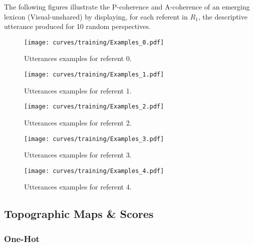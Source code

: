 The following figures illustrate the P-coherence and A-coherence of an emerging lexicon (Visual-unshared) by displaying, for each referent in $R_1$, the descriptive utterance produced for 10 random perspectives.

\begin{figure}[h!]
\centering
    \texttt{[image: curves/training/Examples\_0.pdf]}
\caption{Utterances examples for referent 0.}
\end{figure}

\begin{figure}[h!]
\centering
    \texttt{[image: curves/training/Examples\_1.pdf]}
\caption{Utterances examples for referent 1.}
\end{figure}

\begin{figure}[h!]
\centering
    \texttt{[image: curves/training/Examples\_2.pdf]}
\caption{Utterances examples for referent 2.}
\end{figure}

\begin{figure}[h!]
\centering
    \texttt{[image: curves/training/Examples\_3.pdf]}
\caption{Utterances examples for referent 3.}
\end{figure}

\begin{figure}[h!]
\centering
    \texttt{[image: curves/training/Examples\_4.pdf]}
\caption{Utterances examples for referent 4.}
\end{figure}

\newpage
\subsection{Topographic Maps \& Scores}
\label{sup:topo_maps}

\subsubsection{One-Hot}

